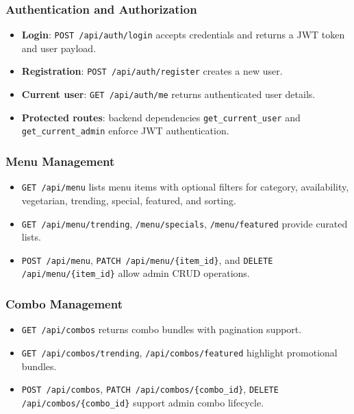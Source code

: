 \documentclass[11pt]{article}
\begin{document}
\subsubsection{Authentication and Authorization}
\begin{itemize}[nosep]
  \item \textbf{Login}: \texttt{POST /api/auth/login} accepts credentials and returns a JWT token and user payload.
  \item \textbf{Registration}: \texttt{POST /api/auth/register} creates a new user.
  \item \textbf{Current user}: \texttt{GET /api/auth/me} returns authenticated user details.
  \item \textbf{Protected routes}: backend dependencies \texttt{get\_current\_user} and \texttt{get\_current\_admin} enforce JWT authentication.
\end{itemize}

\subsubsection{Menu Management}
\begin{itemize}[nosep]
  \item \texttt{GET /api/menu} lists menu items with optional filters for category, availability, vegetarian, trending, special, featured, and sorting.
  \item \texttt{GET /api/menu/trending}, \texttt{/menu/specials}, \texttt{/menu/featured} provide curated lists.
  \item \texttt{POST /api/menu}, \texttt{PATCH /api/menu/\{item\_id\}}, and \texttt{DELETE /api/menu/\{item\_id\}} allow admin CRUD operations.
\end{itemize}

\subsubsection{Combo Management}
\begin{itemize}[nosep]
  \item \texttt{GET /api/combos} returns combo bundles with pagination support.
  \item \texttt{GET /api/combos/trending}, \texttt{/api/combos/featured} highlight promotional bundles.
  \item \texttt{POST /api/combos}, \texttt{PATCH /api/combos/\{combo\_id\}}, \texttt{DELETE /api/combos/\{combo\_id\}} support admin combo lifecycle.
\end{itemize}
\end{document}
